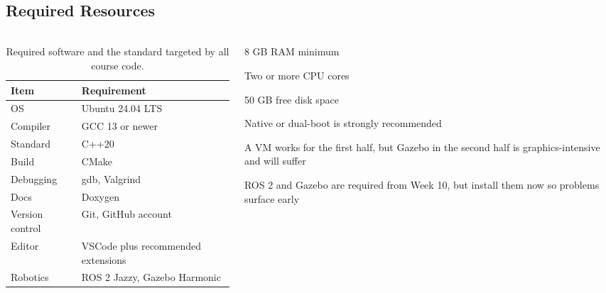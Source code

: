 \documentclass[
    10pt,
    dvipsnames,
    svgnames,
    x11names,
    aspectratio=1610,
    english,
    codeminted]{beamer}
\begin{document}
\subsection*{Required Resources}
\begingroup
\divframetrue
\renewcommand{\divbartextA}{\secname}
\renewcommand{\divbartextB}{}
\begin{frame}{\secname}
  \divbar{\secname}{\subsecname}
  \framesubtitle{\subsecname}

\begin{columns}[T,onlytextwidth]
\begin{column}{0.52\textwidth}
\begin{table}[h]
\caption{Required software and the standard targeted by all course code.}
\scriptsize\centering
\renewcommand{\arraystretch}{1.2}
\begin{tabular}{m{2.2cm}m{3.2cm}}
  \toprule
  \textbf{Item} & \textbf{Requirement} \\
  \midrule
  OS            & Ubuntu 24.04 LTS \\
  Compiler      & GCC 13 or newer \\
  Standard      & C++20 \\
  Build         & CMake \\
  Debugging     & gdb, Valgrind \\
  Docs          & Doxygen \\
  Version control & Git, GitHub account \\
  Editor        & VSCode plus recommended extensions \\
  Robotics      & ROS 2 Jazzy, Gazebo Harmonic \\
  \bottomrule
\end{tabular}
\end{table}
\end{column}
\begin{column}{0.44\textwidth}
\begin{compactitem}
\footnotesize
    \item 8 GB RAM minimum
    \item Two or more CPU cores
    \item 50 GB free disk space
\end{compactitem}

\medskip
{}
\begin{compactitem}
\footnotesize
    \item Native or dual-boot is strongly recommended
    \item A VM works for the first half, but Gazebo in the second half is graphics-intensive and will suffer
    \item ROS 2 and Gazebo are required from Week 10, but install them now so problems surface early
\end{compactitem}


\end{column}
\end{columns}
\end{frame}
\end{document}
